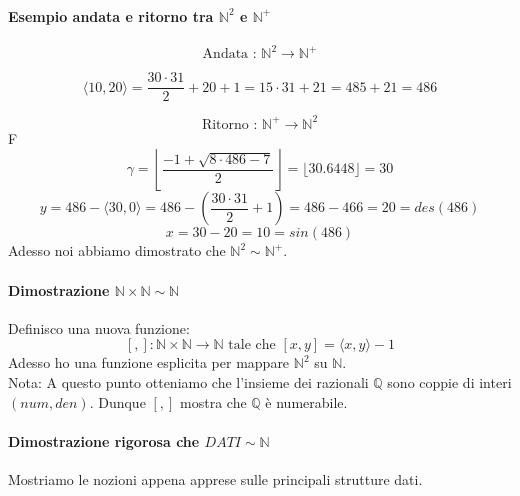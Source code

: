 \documentclass{article}
\begin{document}
\paragraph{Esempio andata e ritorno tra $\mathbb{N}^2$ e $\mathbb{N}^+$}
$$\text{Andata : }\mathbb{N}^2 \longrightarrow\mathbb{N}^+$$

$$\langle 10,20\rangle = \frac{30\cdot31}{2}+20+1=15\cdot31+21=485+21=486$$

$$\text{Ritorno : }\mathbb{N}^+\longrightarrow\mathbb{N}^2$$F
$$\gamma = \left\lfloor \frac{-1 + \sqrt{8 \cdot 486-7}}{2} \right\rfloor = \lfloor 30.6448\rfloor = 30$$
$$y=486- \langle 30,0\rangle = 486- \left(\frac{30\cdot31}{2}+1\right)=486-466=20=des(486)$$
$$x=30-20=10=sin(486)$$
Adesso noi abbiamo dimostrato che $\mathbb{N}^2\sim\mathbb{N}^+$.

\paragraph{Dimostrazione $\mathbb{N}\times\mathbb{N}\sim\mathbb{N}$}
Definisco una nuova funzione:
$$[,]:\mathbb{N}\times\mathbb{N}\rightarrow\mathbb{N}\text{ tale che }[x,y]=\langle x,y\rangle-1$$
Adesso ho una funzione esplicita per mappare $\mathbb{N}^2$ su $\mathbb{N}$.\\Nota: A questo
punto otteniamo che l'insieme dei razionali $\mathbb{Q}$ sono coppie di interi $(num,den)$. Dunque
$[,]$ mostra che $\mathbb{Q}$ è numerabile.

\paragraph{Dimostrazione rigorosa che $DATI\sim\mathbb{N}$}
Mostriamo le nozioni appena apprese sulle principali strutture dati.
\end{document}
